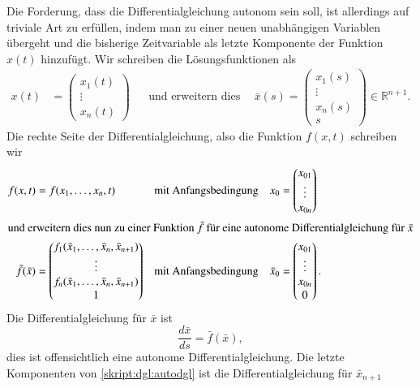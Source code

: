 Die Forderung, dass die Differentialgleichung autonom sein soll, ist
allerdings auf triviale Art zu erfüllen, indem man zu einer neuen
unabhängigen Variablen übergeht und die bisherige Zeitvariable 
als letzte Komponente der Funktion $x(t)$ hinzufügt.
Wir schreiben die Lösungsfunktionen als
\begin{align*}
x(t)
&=
\begin{pmatrix}
x_1(t) \\ \vdots \\x_n(t)
\end{pmatrix}
&&\text{und erweitern dies zu}&
\bar x(s)
=
\begin{pmatrix}
x_1(s) \\ \vdots \\ x_n(s) \\ s
\end{pmatrix}
\in\mathbb R^{n+1}.
\end{align*}
Die rechte Seite der Differentialgleichung, also die Funktion $f(x,t)$
schreiben wir
\begin{align*}
f(x,t)
&=
f(x_1,\dots,x_n,t)
&&\text{mit Anfangsbedingung}&
x_0
&=
\begin{pmatrix} x_{01} \\ \vdots \\ x_{0n} \end{pmatrix}
\\
\intertext{und erweitern dies nun zu einer Funktion $\bar f$ für eine
autonome Differentialgleichung für $\bar x$}
\bar f(\bar x)
&=
\begin{pmatrix}
f_1(\bar x_1,\dots,\bar x_n,\bar x_{n+1})\\
\vdots\\
f_n(\bar x_1,\dots,\bar x_n,\bar x_{n+1})\\
1
\end{pmatrix}
&&\text{mit Anfangsbedingung}&
\bar x_0
&=
\begin{pmatrix} x_{01} \\ \vdots \\ x_{0n} \\ 0\end{pmatrix}.
\end{align*}
Die Differentialgleichung für $\bar x$ ist
\begin{equation}
\frac{d\bar x}{ds}
=
\bar f(\bar x),
\label{skript:dgl:autodgl}
\end{equation}
dies ist offensichtlich eine autonome Differentialgleichung.
Die letzte Komponenten von \eqref{skript:dgl:autodgl} ist die
Differentialgleichung für $\bar x_{n+1}$
